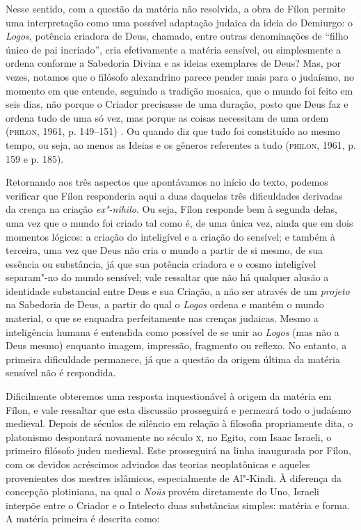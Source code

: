 Nesse sentido, com a questão da matéria não resolvida, a obra de Fílon
permite uma interpretação como uma possível adaptação judaica da
ideia do Demiurgo: o \emph{Logos}, potência criadora de Deus,
chamado, entre outras denominações de “filho único de pai incriado”,
cria efetivamente a matéria sensível, ou simplesmente a ordena
conforme a Sabedoria Divina e as ideias exemplares de Deus? Mas, por
vezes, notamos que o filósofo alexandrino parece pender mais para o
judaísmo, no momento em que entende, seguindo a tradição mosaica, que
o mundo foi feito em seis dias, não porque o Criador precisasse de
uma duração, posto que Deus faz e ordena tudo de uma só vez, mas
porque as coisas necessitam de uma ordem (\textsc{philon}, 1961, p. 149--151) .
Ou quando diz que tudo foi constituído ao mesmo tempo, ou seja, ao
menos as Ideias e os gêneros referentes a tudo (\textsc{philon}, 1961, p. 159
e  p. 185). 

Retornando aos três aspectos que apontávamos no início do texto,
podemos verificar que Fílon responderia aqui a duas daquelas três
dificuldades derivadas da crença na criação \emph{ex"-nihilo}. Ou
seja, Fílon responde bem à segunda delas, uma vez que o mundo foi
criado tal como é, de uma única vez, ainda que em dois momentos
lógicos: a criação do inteligível e a criação do sensível; e também à
terceira, uma vez que Deus não cria o mundo a partir de si mesmo, de
sua essência ou substância, já que sua potência criadora e o cosmo
inteligível separam"-no do mundo sensível; vale ressaltar que não há
qualquer alusão a identidade substancial entre Deus e sua Criação, a
não ser através de um \emph{projeto} na Sabedoria de Deus, a partir
do qual o \emph{Logos} ordena e mantém o mundo material, o que se
enquadra perfeitamente nas crenças judaicas. Mesmo a inteligência
humana é entendida como possível de se unir ao \emph{Logos} (mas
não a Deus mesmo) enquanto imagem, impressão, fragmento ou reflexo.
No entanto, a primeira dificuldade permanece, já que a questão da
origem última da matéria sensível não é respondida.

Dificilmente obteremos uma resposta inquestionável à origem da matéria
em Fílon, e vale ressaltar que esta discussão prosseguirá e permeará
todo o judaísmo medieval. Depois de séculos de silêncio em relação à
filosofia propriamente dita, o platonismo despontará novamente no
século \textsc{x}, no Egito, com Isaac Israeli, o primeiro filósofo judeu
medieval. Este prosseguirá na linha inaugurada por Fílon, com os
devidos acréscimos advindos das teorias neoplatônicas e aqueles
provenientes dos mestres islâmicos, especialmente de Al"-Kindi. À
diferença da concepção plotiniana, na qual o \emph{Noūs} provém
diretamente do Uno, Israeli interpõe entre o Criador e o Intelecto
duas substâncias simples: matéria e forma. A matéria primeira é
descrita como:

